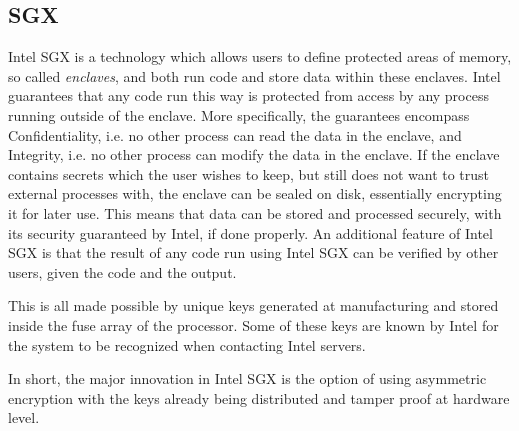 \documentclass[12pt]{article}
\begin{document}
		\subsection{SGX}
		Intel SGX is a technology which allows users to define protected areas of memory, so called \textit{enclaves}, and both run code and store data within these enclaves.
		Intel guarantees \cite{sgx} that any code run this way is protected from access by any process running outside of the enclave. 
		More specifically, the guarantees encompass Confidentiality, i.e. no other process can read the data in the enclave, and Integrity, i.e. no other process can modify the data in the enclave. 
		If the enclave contains secrets which the user wishes to keep, but still does not want to trust external processes with, the enclave can be sealed on disk, essentially encrypting it for later use.
		This means that data can be stored and processed securely, with its security guaranteed by Intel, if done properly.
		An additional feature of Intel SGX is that the result of any code run using Intel SGX can be verified by other users, given the code and the output.

		This is all made possible by unique keys generated at manufacturing and stored inside the fuse array of the processor.
		Some of these keys are known by Intel for the system to be recognized when contacting Intel servers.

		In short, the major innovation in Intel SGX is the option of using asymmetric encryption with the keys already being distributed and tamper proof at hardware level.
\end{document}
